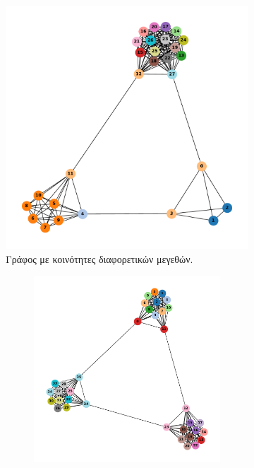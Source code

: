 \documentclass[10pt, letterpaper]{article}
\begin{document}
\begin{figure}
  \centering
  \begin{subfigure}{0.3\linewidth}
      \centering
      \includegraphics[width=\linewidth]{different_size_communities.pdf}
      \caption{Γράφος με κοινότητες διαφορετικών μεγεθών.}
      \label{different_sizes}
  \end{subfigure}
  \begin{subfigure}{0.66\linewidth}
    \centering
    \begin{subfigure}{0.45\linewidth}
        \centering
        \includegraphics[width=\linewidth]{nonconnected_ssize_dcs0.011.pdf}

\end{subfigure}
\end{subfigure}
\end{figure}
\end{document}
